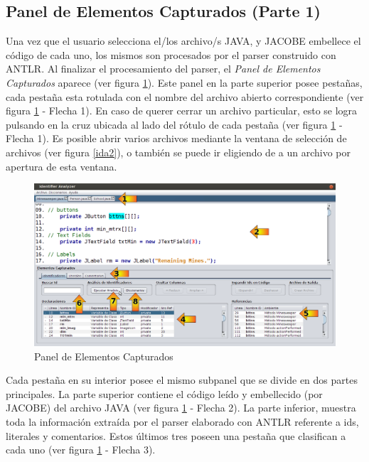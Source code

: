 \subsection{Panel de Elementos Capturados (Parte 1)}

Una vez que el usuario selecciona el/los archivo/s JAVA, y JACOBE embellece el código de cada uno, 
los mismos son procesados por el parser construido con ANTLR. Al finalizar el procesamiento del parser, el \textit{Panel de Elementos Capturados} aparece (ver figura \ref{ida3}). Este panel en la parte superior posee pestañas, cada pestaña esta rotulada con el nombre del archivo abierto correspondiente (ver figura \ref{ida3} - Flecha 1). En caso de querer cerrar un archivo particular, esto se logra pulsando en la cruz ubicada al lado del rótulo de cada pestaña (ver figura \ref{ida3} - Flecha 1). Es posible abrir varios archivos mediante la ventana de selección de archivos (ver figura \ref{ida2}), o también se puede ir eligiendo de a un archivo por apertura de esta ventana. 

\begin{figure}[t] %
\centerline{%
\includegraphics[scale= 0.42]{./cap4/ida_03.png}
}
\caption{Panel de Elementos Capturados}
\label{ida3}
\end{figure}

Cada pestaña en su interior posee el mismo subpanel que se divide en dos partes principales. La parte superior contiene el código leído y embellecido (por JACOBE) del archivo JAVA (ver figura \ref{ida3} - Flecha 2).
La parte inferior, muestra toda la información extraída por el parser elaborado con ANTLR referente a ids, literales y comentarios. Estos últimos tres poseen una pestaña que clasifican a cada uno (ver figura \ref{ida3} - Flecha 3). 

